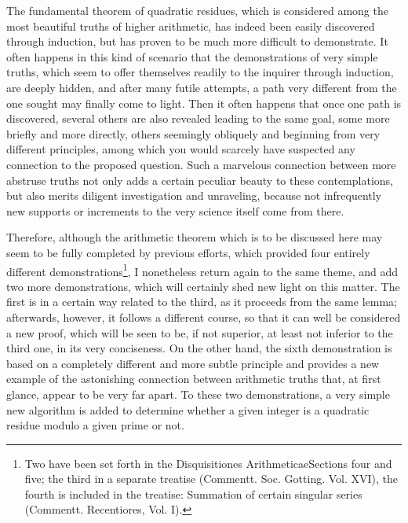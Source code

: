 \documentclass[twoside,12pt]{memoir}
\begin{document}
The fundamental theorem of quadratic residues, which is considered among the most beautiful truths of higher arithmetic, has indeed been easily discovered through induction, but has proven to be much more difficult to demonstrate. It often happens in this kind of scenario that the demonstrations of very simple truths, which seem to offer themselves readily to the inquirer through induction, are deeply hidden, and after many futile attempts, a path very different from the one sought may finally come to light. Then it often happens that once one path is discovered, several others are also revealed leading to the same goal, some more briefly and more directly, others seemingly obliquely and beginning from very different principles, among which you would scarcely have suspected any connection to the proposed question. Such a marvelous connection between more abstruse truths not only adds a certain peculiar beauty to these contemplations, but also merits diligent investigation and unraveling, because not infrequently new supports or increments to the very science itself come from there.
%

Therefore, although the arithmetic theorem which is to be discussed here may seem to be fully completed by previous efforts, which provided four entirely different demonstrations\footnote{Two have been set forth in the Disquisitiones Arithmeticae\enspace Sections four and five; the third in a separate treatise (Commentt. Soc. Gotting. Vol. XVI), the fourth is included in the treatise: Summation of certain singular series (Commentt. Recentiores, Vol. I).}, I nonetheless return again to the same theme, and add two more demonstrations, which will certainly shed new light on this matter. The first is in a certain way related to the third, as it proceeds from the same lemma; afterwards, however, it follows a different course, so that it can well be considered a new proof, which will be seen to be, if not superior, at least not inferior to the third one, in its very conciseness. On the other hand, the sixth demonstration is based on a completely different and more subtle principle and provides a new example of the astonishing connection between arithmetic truths that, at first glance, appear to be very far apart. To these two demonstrations, a very simple new algorithm is added to determine whether a given integer is a quadratic residue modulo a given prime or not.
%
\end{document}
